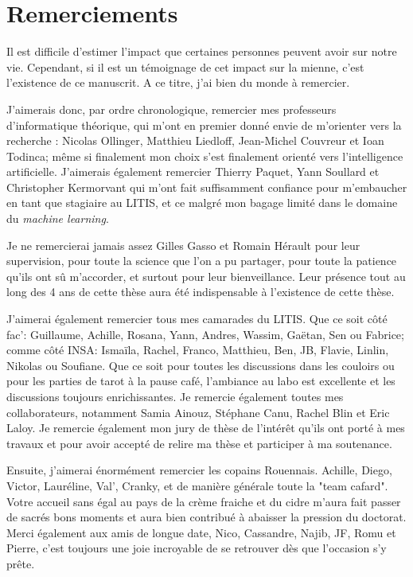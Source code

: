 \chapter*{Remerciements}
\label{chap:remerciements}

Il est difficile d'estimer l'impact que certaines personnes peuvent avoir sur notre vie. Cependant, si il est un témoignage de cet impact sur la mienne, c'est l'existence de ce manuscrit. A ce titre, j'ai bien du monde à remercier.

J'aimerais donc, par ordre chronologique, remercier mes professeurs d'informatique théorique, qui m'ont en premier donné envie de m'orienter vers la recherche : Nicolas Ollinger, Matthieu Liedloff, Jean-Michel Couvreur et Ioan Todinca; même si finalement mon choix s'est finalement orienté vers l'intelligence artificielle. J'aimerais également remercier Thierry Paquet, Yann Soullard et Christopher Kermorvant qui m'ont fait suffisamment confiance pour m'embaucher en tant que stagiaire au LITIS, et ce malgré mon bagage limité dans le domaine du \textit{machine learning}.

Je ne remercierai jamais assez Gilles Gasso et Romain Hérault pour leur supervision, pour toute la science que l'on a pu partager, pour toute la patience qu'ils ont sû m'accorder, et surtout pour leur bienveillance. Leur présence tout au long des 4 ans de cette thèse aura été indispensable à l'existence de cette thèse.

J'aimerai également remercier tous mes camarades du LITIS. Que ce soit côté fac': Guillaume, Achille, Rosana, Yann, Andres, Wassim, Gaëtan, Sen ou Fabrice; comme côté INSA: Ismaïla, Rachel,  Franco, Matthieu, Ben, JB, Flavie, Linlin, Nikolas ou Soufiane. Que ce soit pour toutes les discussions dans les couloirs ou pour les parties de tarot à la pause café, l'ambiance au labo est excellente et les discussions toujours enrichissantes. Je remercie également toutes mes collaborateurs, notamment Samia Ainouz, Stéphane Canu, Rachel Blin et Eric Laloy. Je remercie également mon jury de thèse de l'intérêt qu'ils ont porté à mes travaux et pour avoir accepté de relire ma thèse et participer à ma soutenance.

Ensuite, j'aimerai énormément remercier les copains Rouennais. Achille, Diego, Victor, Lauréline, Val', Cranky, et de manière générale toute la "team cafard". Votre accueil sans égal au pays de la crème fraiche et du cidre m'aura fait passer de sacrés bons moments et aura bien contribué à abaisser la pression du doctorat.  Merci également aux amis de longue date, Nico, Cassandre, Najib, JF, Romu et Pierre, c'est toujours une joie incroyable de se retrouver dès que l'occasion s'y prête.

